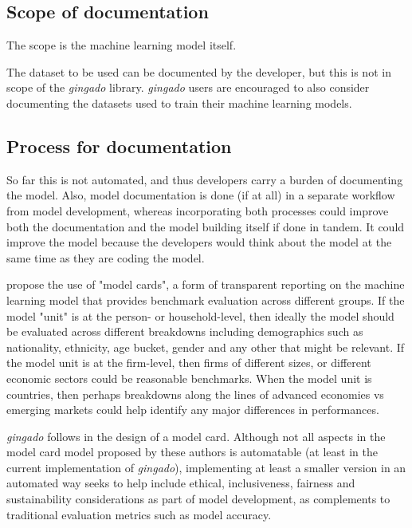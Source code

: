 \documentclass{article}
\begin{document}
\subsection{Scope of documentation}

The scope is the machine learning model itself. 

The dataset to be used can be documented by the developer, but this is not in scope of the \textit{gingado} library. \textit{gingado} users are encouraged to also consider documenting the datasets used to train their machine learning models.

\subsection{Process for documentation}

So far this is not automated, and thus developers carry a burden of documenting the model. Also, model documentation is done (if at all) in a separate workflow from model development, whereas incorporating both processes could improve both the documentation and the model building itself if done in tandem. It could improve the model because the developers would think about the model at the same time as they are coding the model.

\cite{ModelCards} propose the use of "model cards", a form of transparent reporting on the machine learning model that provides benchmark evaluation across different groups. If the model "unit" is at the person- or household-level, then ideally the model should be evaluated across different breakdowns including demographics such as nationality, ethnicity, age bucket, gender and any other that might be relevant. If the model unit is at the firm-level, then firms of different sizes, or different economic sectors could be reasonable benchmarks. When the model unit is countries, then perhaps breakdowns along the lines of advanced economies vs emerging markets could help identify any major differences in performances.


\textit{gingado} follows \cite{ModelCards} in the design of a model card. Although not all aspects in the model card model proposed by these authors is automatable (at least in the current implementation of \textit{gingado}), implementing at least a smaller version in an automated way seeks to help include ethical, inclusiveness, fairness and sustainability considerations as part of model development, as complements to traditional evaluation metrics such as model accuracy.
\end{document}
